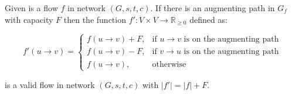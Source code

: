 \begin{thm}\label{augmenting}
Given is a flow $f$ in network $(G, s, t, c)$. If there is an augmenting path in $G_f$ with capacity $F$ then the function $f':V \times V \to \mathbb{R}_{\geq 0}$ defined as:

$$
f'(u \rightarrow v) = 
\begin{cases}
f(u \rightarrow v) + F, & \text{if } u\rightarrow v \text{ is on the augmenting path} \\
f(u \rightarrow v) - F, & \text{if } v\rightarrow u \text{ is on the augmenting path} \\
f(u \rightarrow v), & \text{otherwise}
\end{cases}
$$

is a valid flow in network $(G, s, t, c)$ with $|f'| = |f| + F$.
\end{thm}

